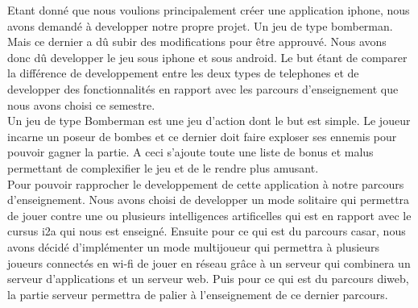 
 Etant donné que nous voulions principalement créer une application
 \gls{iphone}, nous avons demandé à developper notre propre projet. Un jeu de
 type bomberman. Mais ce dernier a dû subir des modifications pour être
 approuvé. Nous avons donc dû developper le jeu sous \gls{iphone} et sous
 \gls{android}. Le but étant de comparer la différence de developpement entre
 les deux types de telephones et de developper des fonctionnalités en rapport
 avec les parcours d'enseignement que nous avons choisi ce semestre.\\
	
Un jeu de type Bomberman est une jeu d'action dont le but est simple. Le joueur
incarne un poseur de bombes et ce dernier doit faire exploser ses ennemis pour
pouvoir gagner la partie. A ceci s'ajoute toute une liste de bonus et malus
permettant de complexifier le jeu et de le rendre plus amusant.\\
	
Pour pouvoir rapprocher le developpement de cette application à notre parcours
d'enseignement. Nous avons choisi de developper un mode solitaire qui permettra
de jouer contre une ou plusieurs intelligences artificelles qui est en rapport
avec le cursus \gls{i2a} qui nous est enseigné. Ensuite pour ce qui est du
parcours \gls{casar}, nous avons décidé d'implémenter un mode multijoueur qui
permettra à plusieurs joueurs connectés en \gls{wi-fi} de jouer en réseau grâce
à un serveur qui combinera un serveur d'applications et un serveur web. Puis
pour ce qui est du parcours \gls{diweb}, la partie serveur permettra de palier à
l'enseignement de ce dernier parcours.
	
